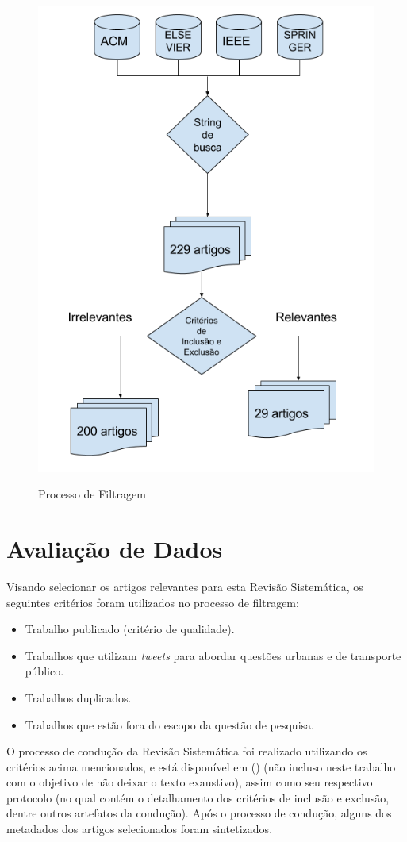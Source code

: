 \documentclass[
	12pt,				%
	oneside,			%
	a4paper,			%
	english,			%
	brazil				%
	]{abntex2ppgsi}
\begin{document}
\begin{figure}[H]%
	\centering
 	  \caption{Processo de Filtragem}
		\includegraphics[width=0.5\linewidth]{images/metodologia_metodologia.png}
	\label{fig:filter}
\end{figure}

\section{Avaliação de Dados}
\label{avaliacao}

Visando selecionar os artigos relevantes para esta Revisão Sistemática, os seguintes critérios foram utilizados no processo de filtragem:

\begin{itemize}
\item Trabalho publicado (critério de qualidade).
\item Trabalhos que utilizam \textit{tweets} para abordar questões urbanas e de transporte público.
\item Trabalhos duplicados.
\item Trabalhos que estão fora do escopo da questão de pesquisa.
\end{itemize}

O processo de condução da Revisão Sistemática foi realizado utilizando os critérios acima mencionados, e está disponível em \citeauthor{fcas} (\citeyear{fcas}) (não incluso neste trabalho com o objetivo de não deixar o texto exaustivo), assim como seu respectivo protocolo (no qual contém o detalhamento dos critérios de inclusão e exclusão, dentre outros artefatos da condução). Após o processo de condução, alguns dos metadados dos artigos selecionados foram sintetizados.
\end{document}
